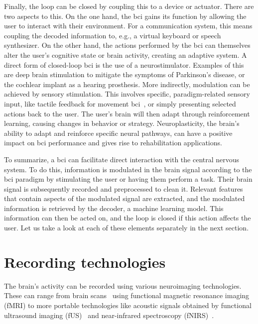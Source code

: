 Finally, the loop can be closed by coupling this to a device or actuator.
There are two aspects to this.
On the one hand, the \ac{bci} gains its function by allowing the user to interact with
their environment.
For a communication system, this means coupling the decoded information to, e.g., a
virtual keyboard or speech synthesizer.
On the other hand, the actions performed by the \ac{bci} can themselves alter the user's
cognitive state or brain activity, creating an adaptive system.
A direct form of closed-loop \ac{bci} is the use of a neurostimulator.
Examples of this are deep brain stimulation to mitigate the symptoms of Parkinson's
disease, or the cochlear implant as a hearing prosthesis.
More indirectly, modulation can be achieved by sensory stimulation.
This involves specific, paradigm-related sensory input, like tactile feedback for
movement \ac{bci}~\cite{Flesher2021}, or simply presenting selected actions back to the
user.
The user's brain will then adapt through reinforcement learning, causing changes in
behavior or strategy.
Neuroplasticity, the brain's ability to adapt and reinforce specific neural pathways,
can have a positive impact on \ac{bci} performance and gives rise to rehabilitation
applications.

To summarize, a \ac{bci} can facilitate direct interaction with the central nervous
system.
To do this, information is modulated in the brain signal according to the \ac{bci}
paradigm by stimulating the user or having them perform a task.
Their brain signal is subsequently recorded and preprocessed to clean it.
Relevant features that contain aspects of the modulated signal are extracted, and the
modulated information is retrieved by the decoder, a machine learning model.
This information can then be acted on, and the loop is closed if this action affects the
user.
Let us take a look at each of these elements separately in the next section.

\section{Recording technologies}
\label{sec:bci-recording}

The brain's activity can be recorded using various neuroimaging technologies.
These can range from brain scans~\cite{Weiskopf2004} using functional magnetic resonance
imaging (fMRI) to more portable technologies like acoustic signals obtained by
functional ultrasound imaging (fUS)~\cite{Zheng2023} and near-infrared spectroscopy
(fNIRS)~\cite{Borgheai2020}.

